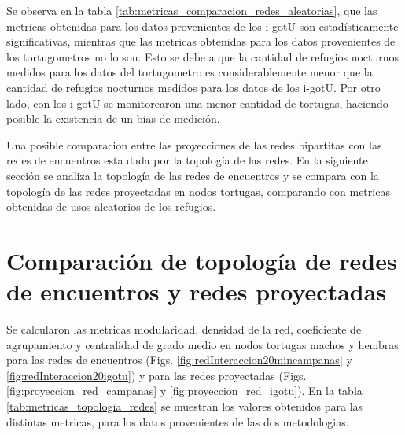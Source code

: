 Se observa en la tabla \ref{tab:metricas_comparacion_redes_aleatorias}, que las metricas obtenidas para los datos provenientes de los i-gotU son estadísticamente significativas, mientras que las metricas obtenidas para los datos provenientes de los tortugometros no lo son. Esto se debe a que la cantidad de refugios nocturnos medidos para los datos del tortugometro es considerablemente menor que la cantidad de refugios nocturnos medidos para los datos de los i-gotU. Por otro lado, con los i-gotU se monitorearon una menor cantidad de tortugas, haciendo posible la existencia de un bias de medición.

Una posible comparacion entre las proyecciones de las redes bipartitas con las redes de encuentros esta dada por la topología de las redes.  En la siguiente sección se analiza la topología de las redes de encuentros y se compara con la topología de las redes proyectadas en nodos tortugas, comparando con metricas obtenidas de usos aleatorios de los refugios. 
\section{Comparación de topología de redes de encuentros y redes proyectadas}
Se calcularon las metricas modularidad, densidad de la red, coeficiente de agrupamiento y centralidad de grado medio en nodos tortugas machos y hembras para las redes de encuentros (Figs. \ref{fig:redInteraccion20mincampanas} y \ref{fig:redInteraccion20igotu}) y para las redes proyectadas (Figs. \ref{fig:proyeccion_red_campanas} y \ref{fig:proyeccion_red_igotu}). En la tabla \ref{tab:metricas_topologia_redes}   se muestran los valores obtenidos para las distintas metricas, para los datos provenientes de las dos metodologias.



